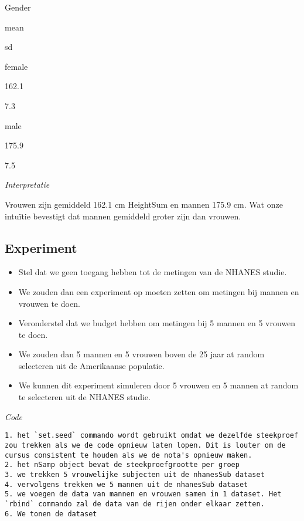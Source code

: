 \documentclass[
  12pt,dutch,coursenotes]{book}
\theoremstyle{definition}
\theoremstyle{definition}
\theoremstyle{definition}
\theoremstyle{remark}
\begin{document}
Gender

mean

sd

female

162.1

7.3

male

175.9

7.5

\emph{Interpretatie}

Vrouwen zijn gemiddeld 162.1 cm HeightSum en mannen 175.9 cm.
Wat onze intuïtie bevestigt dat mannen gemiddeld groter zijn dan vrouwen.

\hypertarget{experiment}{%
\subsection{Experiment}\label{experiment}}

\begin{itemize}
\item
  Stel dat we geen toegang hebben tot de metingen van de NHANES studie.
\item
  We zouden dan een experiment op moeten zetten om metingen bij mannen en vrouwen te doen.
\item
  Veronderstel dat we budget hebben om metingen bij 5 mannen en 5 vrouwen te doen.
\item
  We zouden dan 5 mannen en 5 vrouwen boven de 25 jaar at random selecteren uit de Amerikaanse populatie.
\item
  We kunnen dit experiment simuleren door 5 vrouwen en 5 mannen at random te selecteren uit de NHANES studie.
\end{itemize}

\emph{Code}

\begin{verbatim}
1. het `set.seed` commando wordt gebruikt omdat we dezelfde steekproef zou trekken als we de code opnieuw laten lopen. Dit is louter om de cursus consistent te houden als we de nota's opnieuw maken.
2. het nSamp object bevat de steekproefgrootte per groep
3. we trekken 5 vrouwelijke subjecten uit de nhanesSub dataset
4. vervolgens trekken we 5 mannen uit de nhanesSub dataset
5. we voegen de data van mannen en vrouwen samen in 1 dataset. Het `rbind` commando zal de data van de rijen onder elkaar zetten.
6. We tonen de dataset
\end{verbatim}
\end{document}
